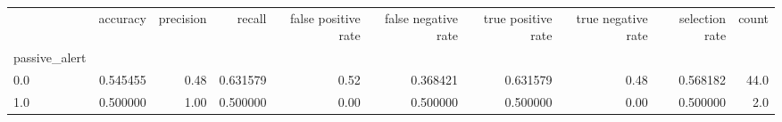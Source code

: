\begin{tabular}{lrrrrrrrrr}
\toprule
{} &  accuracy &  precision &    recall &  false positive rate &  false negative rate &  true positive rate &  true negative rate &  selection rate &  count \\
passive\_alert &           &            &           &                      &                      &                     &                     &                 &        \\
\midrule
0.0           &  0.545455 &       0.48 &  0.631579 &                 0.52 &             0.368421 &            0.631579 &                0.48 &        0.568182 &   44.0 \\
1.0           &  0.500000 &       1.00 &  0.500000 &                 0.00 &             0.500000 &            0.500000 &                0.00 &        0.500000 &    2.0 \\
\bottomrule
\end{tabular}
